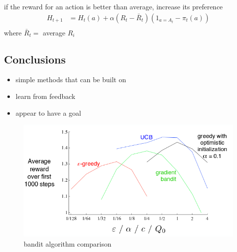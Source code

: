 \documentclass[]{article}
\theoremstyle{definition}
\begin{document}
if the reward for an action is better than average, increase its preference
\begin{eqnarray*}
    H_{t+1} &= H_t(a) + \alpha(R_t - \bar R_t)(1_{a = A_t} - \pi_t(a)) \\
\end{eqnarray*}
where $\bar R_t = $ average $R_i$

\subsection{Conclusions}
\label{sub:conclusions}
\begin{itemize}
    \item simple methods that can be built on
    \item learn from feedback
    \item appear to have a goal
\end{itemize}

\begin{figure}[ht]
    \centering
    \includegraphics[width=0.7\linewidth]{bandit_comparison.png}
    \caption{bandit algorithm comparison}
    \label{fig:bandit-comparison}
\end{figure}
\end{document}
